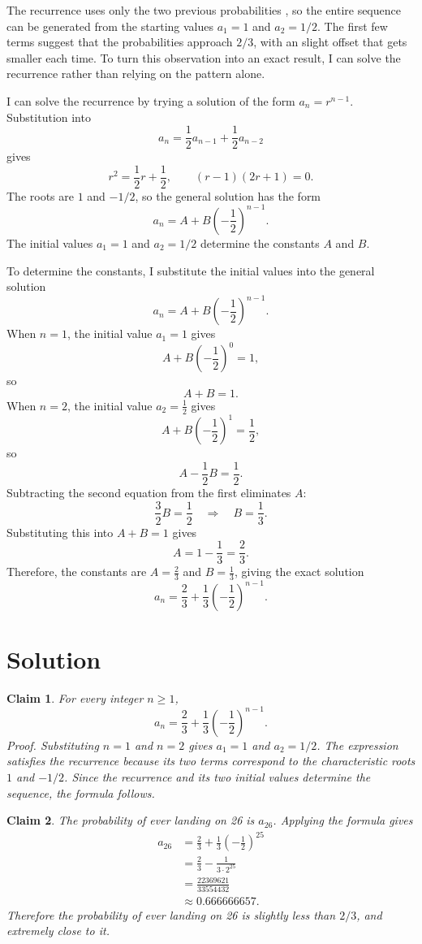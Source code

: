 \documentclass[11pt]{article}
\newcommand{\keywordfont}{\textsc}
\newcommand{\keyword}[1]{%
  \marginpar{\raggedright\small\keywordfont{#1}}}
\newtheorem{claim}{Claim}
\begin{document}
The recurrence uses only the two previous probabilities \keyword{AHA}, so the entire sequence can be generated from the starting values $a_1=1$ and $a_2=1/2$. The first few terms suggest that the probabilities approach $2/3$, with an slight offset that gets smaller each time. To turn this observation into an exact result, I can solve the recurrence rather than relying on the pattern alone.

I can solve \keyword{PLAN} the recurrence by trying a solution of the form $a_n=r^{n-1}$. Substitution into
\[
 a_n=\frac12a_{n-1}+\frac12a_{n-2}
\]
gives
\[
 r^2=\frac12r+\frac12,
 \qquad (r-1)(2r+1)=0.
\]
The roots are $1$ and $-1/2$, so the general solution has the form
\[
 a_n=A+B\left(-\frac12\right)^{n-1}.
\]
The initial values $a_1=1$ and $a_2=1/2$ determine the constants $A$ and $B$.

To determine the constants, I substitute the initial values into the general solution
\[
a_n=A+B\left(-\frac12\right)^{n-1}.
\]
When \(n=1\), the initial value \(a_1=1\) gives
\[
A+B\left(-\frac12\right)^0=1,
\]
so
\[
A+B=1.
\]
When \(n=2\), the initial value \(a_2=\frac12\) gives
\[
A+B\left(-\frac12\right)^1=\frac12,
\]
so
\[
A-\frac12B=\frac12.
\]
Subtracting the second equation from the first eliminates \(A\):
\[
\frac32B=\frac12
\quad\Longrightarrow\quad B=\frac13.
\]
Substituting this into \(A+B=1\) gives
\[
A=1-\frac13=\frac23.
\]
Therefore, the constants are \(A=\frac23\) and \(B=\frac13\), giving the exact solution
\[
\boxed{a_n=\frac23+\frac13\left(-\frac12\right)^{n-1}}.
\]

\section{Solution}

\begin{claim}
For every integer $n\geq 1$,
\[
 a_n=\frac23+\frac13\left(-\frac12\right)^{n-1}.
\]
\textit{Proof.} Substituting $n=1$ and $n=2$ gives $a_1=1$ and $a_2=1/2$. The expression satisfies the recurrence because its two terms correspond to the characteristic roots $1$ and $-1/2$. Since the recurrence and its two initial values determine the sequence, the formula follows.
\end{claim}

\begin{claim}
The probability of ever landing on 26 is $a_{26}$. Applying the formula gives
\begin{align*}
 a_{26}
 &=\frac23+\frac13\left(-\frac12\right)^{25}\\
 &=\frac23-\frac{1}{3\cdot 2^{25}}\\
 &=\boxed{\frac{22369621}{33554432}}\\
 &\approx 0.666666657.
\end{align*}
Therefore the probability of ever landing on 26 is slightly less than $2/3$, and extremely close to it.
\end{claim}
\end{document}
